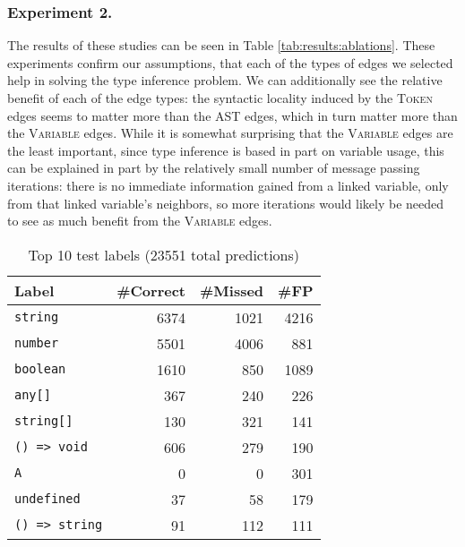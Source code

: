 \subsubsection{Experiment 2.} The results of these studies can be seen in Table \ref{tab:results:ablations}.
These experiments confirm our assumptions, that each of the types of edges we selected help in solving the type inference problem.
We can additionally see the relative benefit of each of the edge types: the syntactic locality induced by the \textsc{Token} edges seems to matter more than the AST edges, which in turn matter more than the \textsc{Variable} edges.
While it is somewhat surprising that the \textsc{Variable} edges are the least important, since type inference is based in part on variable usage, this can be explained in part by the relatively small number of message passing iterations: there is no immediate information gained from a linked variable, only from that linked variable's neighbors, so more iterations would likely be needed to see as much benefit from the \textsc{Variable} edges.

\begin{table}
  \centering
  {\renewcommand{\arraystretch}{1.3}%
  \begin{tabular}{lrrr}
    \textbf{Label} & \textbf{\#Correct} & \textbf{\#Missed} & \textbf{\#FP} \\
    \hline
    \texttt{string} & 6374 & 1021 & 4216 \\
    \texttt{number} & 5501 & 4006 & 881 \\
    \texttt{boolean} & 1610 & 850 & 1089 \\
    \texttt{any[]} & 367 & 240 & 226 \\
    \texttt{string[]} & 130 & 321 & 141 \\
    \texttt{() => void} & 606 & 279 & 190 \\
    \texttt{A}  & 0 & 0 & 301 \\
    \texttt{undefined} & 37 & 58 & 179 \\
    \texttt{() => string} & 91 & 112 & 111
  \end{tabular}
   }
  \caption{Top 10 test labels (23551 total predictions)}\label{tab:test-fps}
\end{table}

